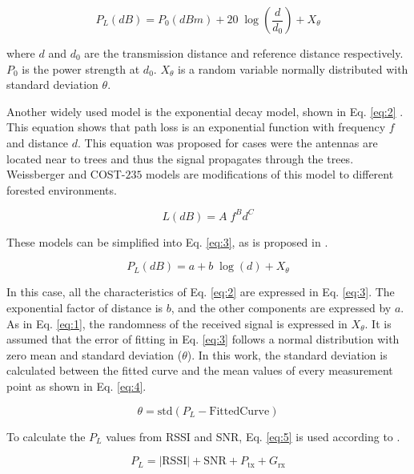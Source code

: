 \begin{equation} 
\label{eq:1}
P_L(dB) = P_0(dBm) + 20\;\log\left(\frac{d}{d_0}\right)+X_\theta
\end{equation}  

\noindent where $d$ and $d_0$ are the transmission distance and reference distance respectively. $P_0$ is the power strength at $d_0$. $X_\theta$ is a random variable normally distributed with standard deviation $\theta$.

Another widely used model is the exponential decay model, shown in Eq. \eqref{eq:2} \cite{RamaRao2012}. This equation shows that path loss is an exponential function with frequency $f$ and distance $d$. This equation was proposed for cases were the antennas are located near to trees and thus the signal propagates through the trees. Weissberger and COST-$235$ models are modifications of this model to different forested environments.

\begin{equation}
\label{eq:2}
L(dB) = A\; f^{B}d^{C}
\end{equation} 

These models can be simplified into Eq. \eqref{eq:3}, as is proposed in \cite{Iswandi2017}.

\begin{equation}
\label{eq:3}
P_L(dB) = a + b\;\log(d)+X_\theta
\end{equation}

In this case, all the characteristics of Eq. \eqref{eq:2} are expressed in Eq. \eqref{eq:3}. The exponential factor of distance is $b$, and the other components are expressed by $a$. As in Eq. \eqref{eq:1}, the randomness of the received signal is expressed in $X_\theta$. It is assumed that the error of fitting in Eq. \eqref{eq:3} follows a normal distribution with zero mean and standard deviation ($\theta$). In this work, the standard deviation is calculated between the fitted curve and the mean values of every measurement point as shown in Eq. \eqref{eq:4}.

\begin{equation} \label{eq:4}
\theta = \text{std}(P_L-\text{FittedCurve})
\end{equation}

To calculate the $P_L$ values from RSSI and SNR, Eq. \eqref{eq:5} is used according to \cite{Mikhaylov2016}.

\begin{equation} \label{eq:5}
P_L=|\text{RSSI}|+\text{SNR}+P_{\text{tx}}+G_{\text{rx}}
\end{equation}

